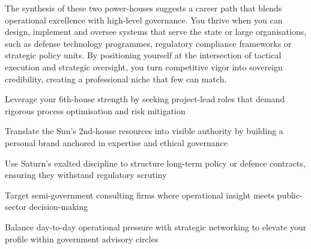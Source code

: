 {\fontsize{9}{13}\selectfont The synthesis of these two power-houses suggests a career path that blends operational excellence with high-level governance. You thrive when you can design, implement and oversee systems that serve the state or large organisations, such as defense technology programmes, regulatory compliance frameworks or strategic policy units. By positioning yourself at the intersection of tactical execution and strategic oversight, you turn competitive vigor into sovereign credibility, creating a professional niche that few can match.}\par\vspace{1.8mm}

\begin{diamondlist}
  \item {\fontsize{8.5}{12}\selectfont Leverage your 6th-house strength by seeking project-lead roles that demand rigorous process optimisation and risk mitigation}
  \item {\fontsize{8.5}{12}\selectfont Translate the Sun's 2nd-house resources into visible authority by building a personal brand anchored in expertise and ethical governance}
  \item {\fontsize{8.5}{12}\selectfont Use Saturn's exalted discipline to structure long-term policy or defence contracts, ensuring they withstand regulatory scrutiny}
  \item {\fontsize{8.5}{12}\selectfont Target semi-government consulting firms where operational insight meets public-sector decision-making}
  \item {\fontsize{8.5}{12}\selectfont Balance day-to-day operational pressure with strategic networking to elevate your profile within government advisory circles}
\end{diamondlist}


\label{topic47}

